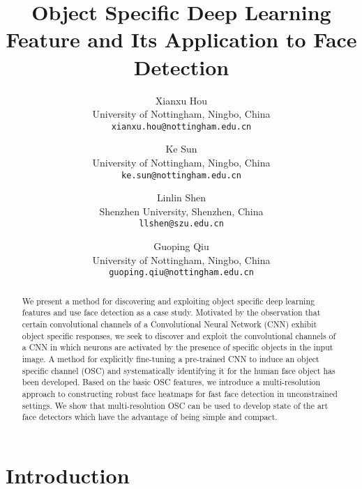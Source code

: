 \documentclass[10pt,twocolumn,letterpaper]{article}
\begin{document}
\title{Object Specific Deep Learning Feature and Its Application to Face Detection}

\author{Xianxu Hou \\
University of Nottingham, Ningbo, China\\
{\tt\small xianxu.hou@nottingham.edu.cn}
\and
Ke Sun \\
University of Nottingham, Ningbo, China\\
{\tt\small ke.sun@nottingham.edu.cn}
\and
Linlin Shen \\
Shenzhen University, Shenzhen, China\\
{\tt\small llshen@szu.edu.cn}
\and
Guoping Qiu \\
University of Nottingham, Ningbo, China\\
{\tt\small guoping.qiu@nottingham.edu.cn}
}

\maketitle
\ifwacvfinal\thispagestyle{empty}\fi



\begin{abstract}
We present a method for discovering and exploiting object specific deep learning features and use face detection as a case study. Motivated by the observation that certain convolutional channels of a Convolutional Neural Network (CNN) exhibit object specific responses, we seek to discover and exploit the convolutional channels of a CNN in which neurons are activated by the presence of specific objects in the input image. A method for explicitly fine-tuning a pre-trained CNN to induce an object specific channel (OSC) and systematically identifying it for the human face object has been developed. Based on the basic OSC features, we introduce a multi-resolution approach to constructing robust face heatmaps for fast face detection in unconstrained settings. We show that multi-resolution OSC can be used to develop state of the art face detectors which have the advantage of being simple and compact.
\end{abstract}

\section{Introduction}
\label{sec:intro}
\end{document}
